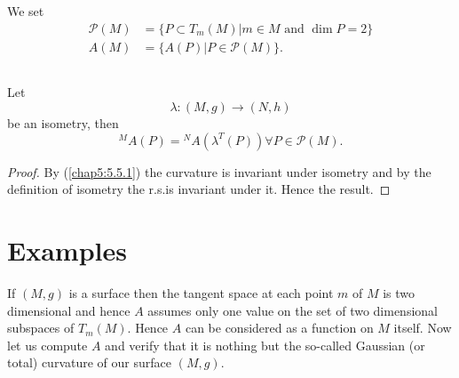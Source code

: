\subsection{}\label{chap6:6.1.4}
We set
\begin{align*}
\mathscr{P}(M) &= \{P\subset T_{m}(M)|m\in M\text{ \  and \ } \dim
P=2\}\\
A(M) &= \{A(P)|P\in\mathscr{P}(M)\}.
\end{align*}

\setcounter{subsection}{4}

\subsection{}\label{chap6:6.1.5}

\begin{prop*}
Let
$$
\lambda:(M,g)\to (N,h)
$$
be an isometry, then
$$
{}^M{A(P)}={}^NA(\lambda^{T}(P))\forall P\in\mathscr{P}(M).
$$
\end{prop*}

\begin{proof}
By (\ref{chap5:5.5.1}) the curvature is invariant under isometry and by
the definition of isometry the r.s.\@ is invariant under it. Hence the result.
\end{proof}

\setcounter{section}{1}
\section{Examples}\label{chap6:sec2}\pageoriginale

If $(M,g)$ is a surface then the tangent space at each point $m$ of
$M$ is two dimensional and hence $A$ assumes only one value on the set
of two dimensional subspaces of $T_{m}(M)$. Hence $A$ can be
considered as a function on $M$ itself. Now let us compute $A$ and
verify that it is nothing but the so-called Gaussian (or total)
curvature of our surface $(M,g)$.

